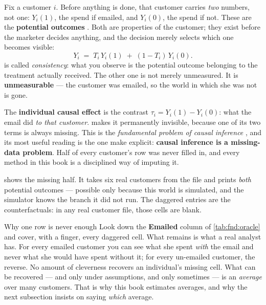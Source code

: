 Fix a customer $i$. Before anything is done, that customer carries \emph{two} numbers, not one:
$Y_i(1)$, the spend if emailed, and $Y_i(0)$, the spend if not. These are the \textbf{potential
outcomes} \citep{neyman1923, rubin1974}. Both are properties of the customer; they exist before
the marketer decides anything, and the decision merely selects which one becomes visible:
%
\begin{equation}
  Y_i \;=\; T_i\,Y_i(1) \;+\; (1 - T_i)\,Y_i(0).
  \label{eq:fnd:consistency}
\end{equation}
%
 is called \emph{consistency}: what you observe is the potential outcome
belonging to the treatment actually received. The other one is not merely unmeasured. It is
\textbf{unmeasurable} --- the customer was emailed, so the world in which she was not is gone.

The \textbf{individual causal effect} is the contrast $\tau_i = Y_i(1) - Y_i(0)$: what the email
did \emph{to that customer}.  makes it permanently invisible, because
one of its two terms is always missing. This is the \emph{fundamental problem of causal
inference} \citep{holland1986}, and its most useful reading is the one \citet{ding2018} make
explicit: \textbf{causal inference is a missing-data problem}. Half of every customer's row was
never filled in, and every method in this book is a disciplined way of imputing it.

 shows the missing half. It takes six real customers from the file and
prints \emph{both} potential outcomes --- possible only because this world is simulated, and the
simulator knows the branch it did not run. The daggered entries are the counterfactuals: in any
real customer file, those cells are blank.



\begin{intuition}{Why one row is never enough}
Look down the \textbf{Emailed} column of \cref{tab:fnd:oracle} and cover, with a finger, every
daggered cell. What remains is what a real analyst has. For every emailed customer you can see
what she spent \emph{with} the email and never what she would have spent without it; for every
un-emailed customer, the reverse. No amount of cleverness recovers an individual's missing cell.
What can be recovered --- and only under assumptions, and only sometimes --- is an \emph{average}
over many customers. That is why this book estimates averages, and why the next subsection
insists on saying \emph{which} average.
\end{intuition}

